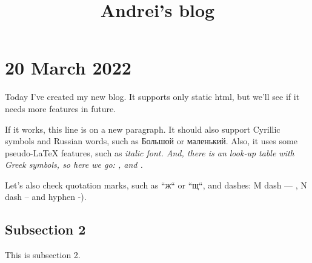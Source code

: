 \title{Andrei's blog}
\section{20 March 2022}
Today I've created my new blog. It supports only static html, but
we'll see if it needs more features in future.
\par
If it works, this line is on a new paragraph. It should also support
Cyrillic symbols and Russian words, such as Большой or маленький.
Also, it uses some pseudo-LaTeX features, such as \it{italic} font. And,
there is an look-up table with Greek symbols, so here we go:
\Alpha \Beta \Gamma \Delta \epsilon \Epsilon, \omicron and \Omicron.
\par
Let's also check quotation marks,
such as ``ж`` or ``щ``, and dashes:
M dash --- , N dash -- and hyphen -).
\subsection{Subsection 2}
This is subsection 2.
